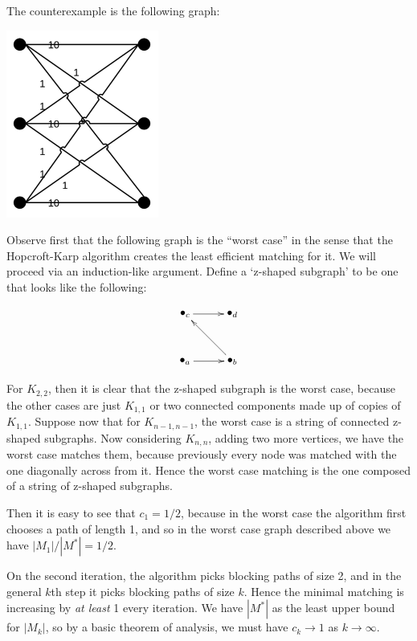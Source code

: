 \documentclass{article}
\newcommand{\problem}[1]{\noindent {\bf #1}}
\begin{document}
\problem{Problem 1.} The counterexample is the following graph:

\includegraphics[width=50mm]{grapha.png}

\problem{Problem 2.} Observe first that the following graph is the ``worst case'' in the sense that the Hopcroft-Karp algorithm creates the least efficient matching for it. We will proceed via an induction-like argument. Define a `z-shaped subgraph' to be one that looks like the following:

\begin{displaymath}
\xygraph{
!{<0cm,0cm>;<1cm,0cm>:<0cm,1cm>::}
!{(0,0) }*+{\bullet_{a}}="a"
!{(1.5,0) }*+{\bullet_{b}}="b"
!{(0,1.5) }*+{\bullet_{c}}="c"
!{(1.5,1.5)}*+{\bullet_{d}}="d"
"a":"b"
"b":"c"
"c":"d"
}
\end{displaymath}

For $K_{2,2}$, then it is clear that the z-shaped subgraph is the worst case, because the other cases are just $K_{1,1}$ or two connected components made up of copies of $K_{1,1}$. Suppose now that for $K_{n-1,n-1}$, the worst case is a string of connected z-shaped subgraphs. Now considering $K_{n,n}$, adding two more vertices, we have the worst case matches them, because previously every node was matched with the one diagonally across from it. Hence the worst case matching is the one composed of a string of z-shaped subgraphs.

Then it is easy to see that $c_1=1/2$, because in the worst case the algorithm first chooses a path of length 1, and so in the worst case graph described above we have $|M_1|/|M^{\ast}|=1/2$.



On the second iteration, the algorithm picks blocking paths of size 2, and in the general $k$th step it picks blocking paths of size $k$. Hence the minimal matching is increasing by \emph{at least} 1 every iteration. We have $|M^{\ast}|$ as the least upper bound for $|M_k|$, so by a basic theorem of analysis, we must have $c_k\to 1$ as $k\to\infty$.
\end{document}
